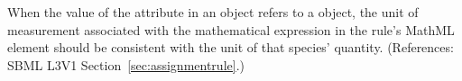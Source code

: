 When the value of the attribute  in an \AssignmentRule
object refers to a \Species object, the unit of measurement associated with
the mathematical expression in the rule's MathML  element
should be consistent with the unit of that species' quantity.  (References:
SBML L3V1 Section~\ref{sec:assignmentrule}.)
